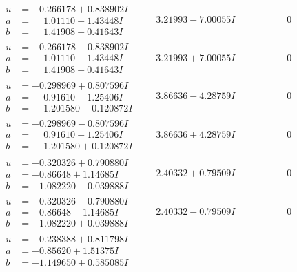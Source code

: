 \documentclass[1p]{elsarticle_modified}
\theoremstyle{definition}
\begin{document}
$$\begin{array}{c|c|c}
\begin{aligned}
u &= -0.266178 + 0.838902 I \\
a &= \phantom{-}1.01110 - 1.43448 I \\
b &= \phantom{-}1.41908 - 0.41643 I\end{aligned}
 & \phantom{-}3.21993 - 7.00055 I & \phantom{-0.000000 } 0 \\ \hline\begin{aligned}
u &= -0.266178 - 0.838902 I \\
a &= \phantom{-}1.01110 + 1.43448 I \\
b &= \phantom{-}1.41908 + 0.41643 I\end{aligned}
 & \phantom{-}3.21993 + 7.00055 I & \phantom{-0.000000 } 0 \\ \hline\begin{aligned}
u &= -0.298969 + 0.807596 I \\
a &= \phantom{-}0.91610 - 1.25406 I \\
b &= \phantom{-}1.201580 - 0.120872 I\end{aligned}
 & \phantom{-}3.86636 - 4.28759 I & \phantom{-0.000000 } 0 \\ \hline\begin{aligned}
u &= -0.298969 - 0.807596 I \\
a &= \phantom{-}0.91610 + 1.25406 I \\
b &= \phantom{-}1.201580 + 0.120872 I\end{aligned}
 & \phantom{-}3.86636 + 4.28759 I & \phantom{-0.000000 } 0 \\ \hline\begin{aligned}
u &= -0.320326 + 0.790880 I \\
a &= -0.86648 + 1.14685 I \\
b &= -1.082220 - 0.039888 I\end{aligned}
 & \phantom{-}2.40332 + 0.79509 I & \phantom{-0.000000 } 0 \\ \hline\begin{aligned}
u &= -0.320326 - 0.790880 I \\
a &= -0.86648 - 1.14685 I \\
b &= -1.082220 + 0.039888 I\end{aligned}
 & \phantom{-}2.40332 - 0.79509 I & \phantom{-0.000000 } 0 \\ \hline\begin{aligned}
u &= -0.238388 + 0.811798 I \\
a &= -0.85620 + 1.51375 I \\
b &= -1.149650 + 0.585085 I\end{aligned}

\end{array}$$
\end{document}
